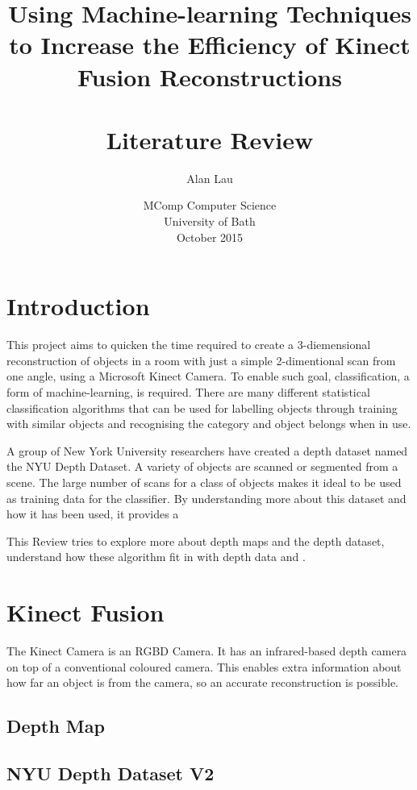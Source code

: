 \documentclass[11pt,openright,a4paper]{report}
\title{
  Using Machine-learning Techniques to Increase the Efficiency of Kinect Fusion Reconstructions
  \\~\\
  \textbf{Literature Review}
}
\author{Alan Lau}
\date{MComp Computer Science\\University of Bath\\October 2015}
\begin{document}
\maketitle
\newpage

\tableofcontents
\newpage

\setcounter{page}{1}

\setlength{\parindent}{0pt}
\setlength{\parskip}{\baselineskip}

\chapter{Introduction}
This project aims to quicken the time required to create a 3-diemensional reconstruction of objects in a room with just a simple 2-dimentional scan from one angle, using a Microsoft Kinect Camera. To enable such goal, classification, a form of machine-learning, is required. There are many different statistical classification algorithms that can be used for labelling objects through training with similar objects and recognising the category and object belongs when in use. 

A group of New York University researchers have created a depth dataset named the NYU Depth Dataset. A variety of objects are scanned or segmented from a scene. The large number of scans for a class of objects makes it ideal to be used as training data for the classifier. By understanding more about this dataset and how it has been used, it provides a 

This Review tries to explore more about depth maps and the depth dataset, understand how these algorithm fit in with depth data and .

\newpage


\chapter{Kinect Fusion}
The Kinect Camera is an RGBD Camera. It has an infrared-based depth camera on top of a conventional coloured camera. This enables extra information about how far an object is from the camera, so an accurate reconstruction is possible.
\section{Depth Map}
\section{NYU Depth Dataset V2}
\newpage
\end{document}
